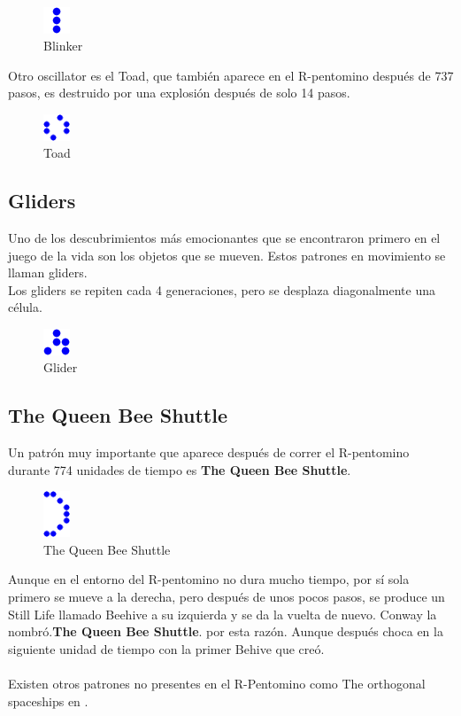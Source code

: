 \begin{figure}[h]
	\centering
	\includegraphics[width=0.07\textwidth]{capitulo1/images/blinker.png}
	\caption{Blinker}
	\label{fig:blinker}
\end{figure}
Otro oscillator es el Toad, que también aparece en el R-pentomino después de 737 pasos, es destruido por una explosión después de solo 14 pasos.
\begin{figure}[h]
	\centering
	\includegraphics[width=0.07\textwidth]{capitulo1/images/toad.png}
	\caption{Toad}
	\label{fig:toad}
\end{figure}
\newpage
\subsection{Gliders	}
Uno de los descubrimientos más emocionantes que se encontraron primero en el juego de la vida son los objetos que se mueven. Estos patrones en movimiento se llaman gliders.\\
Los gliders se repiten cada 4 generaciones, pero se desplaza diagonalmente una célula.

\begin{figure}[h]
	\centering
	\includegraphics[width=0.07\textwidth]{capitulo1/images/glider.png}
	\caption{Glider}
	\label{fig:glider}
\end{figure}

\subsection{The Queen Bee Shuttle}
Un patrón muy importante que aparece después de correr el R-pentomino durante 774 unidades de tiempo es \textbf{The Queen Bee Shuttle}.

\begin{figure}[h]
	\centering
	\includegraphics[width=0.07\textwidth]{capitulo1/images/queen.png}
	\caption{The Queen Bee Shuttle}
	\label{fig:bee}
\end{figure}
Aunque en el entorno del R-pentomino no dura mucho tiempo, por sí sola primero se mueve a la derecha, pero después de unos pocos pasos, se produce un Still Life llamado Beehive a su izquierda y se da la vuelta de nuevo. Conway la nombró.\textbf{The Queen Bee Shuttle}. por esta razón. Aunque después choca en la siguiente unidad de tiempo con la primer Behive que creó.\\\\
Existen otros patrones no presentes en el R-Pentomino como The orthogonal spaceships  en \cite{mathpaul}.